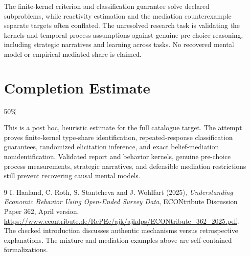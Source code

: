 \documentclass[11pt,a4paper]{article}
\begin{document}
The finite-kernel criterion and classification guarantee solve declared subproblems, while reactivity estimation and the mediation counterexample separate targets often conflated. The unresolved research task is validating the kernels and temporal process assumptions against genuine pre-choice reasoning, including strategic narratives and learning across tasks. No recovered mental model or empirical mediated share is claimed.

\section{Completion Estimate}
50\%

This is a post hoc, heuristic estimate for the full catalogue target.
The attempt proves finite-kernel type-share identification, repeated-response classification guarantees, randomized elicitation inference, and exact belief-mediation nonidentification. Validated report and behavior kernels, genuine pre-choice process measurements, strategic narratives, and defensible mediation restrictions still prevent recovering causal mental models.

\begin{thebibliography}{9}
 I. Haaland, C. Roth, S. Stantcheva and J. Wohlfart (2025), \emph{Understanding Economic Behavior Using Open-Ended Survey Data}, ECONtribute Discussion Paper 362, April version. \url{https://www.econtribute.de/RePEc/ajk/ajkdps/ECONtribute_362_2025.pdf}. The checked introduction discusses authentic mechanisms versus retrospective explanations. The mixture and mediation examples above are self-contained formalizations.
\end{thebibliography}
\end{document}
